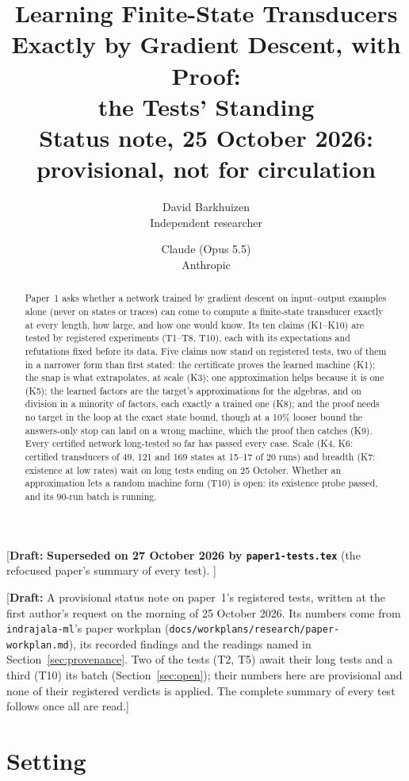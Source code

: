 \documentclass[11pt]{article}
\title{Learning Finite-State Transducers Exactly by Gradient Descent, with Proof:\\
the Tests' Standing\\[0.5em]
\large Status note, 25 October 2026: provisional, not for circulation}
\author{
  David Barkhuizen\\
  Independent researcher
  \and
  Claude (Opus 5.5)\\
  Anthropic
}
\date{}
\newcommand{\draftnote}[1]{\textcolor{red!70!black}{[\textbf{Draft:} #1]}}
\begin{document}
\maketitle

\draftnote{\textbf{Superseded on 27 October 2026 by \texttt{paper1-tests.tex}} (the refocused paper's summary of every test). }

\draftnote{A provisional status note on paper~1's registered tests, written at the first author's
request on the morning of 25 October 2026. Its numbers come from \texttt{indrajala-ml}'s paper
workplan (\texttt{docs/workplans/research/paper-workplan.md}), its recorded findings and the readings named
in Section~\ref{sec:provenance}. Two of the tests (T2, T5) await their long tests and a third
(T10) its batch (Section~\ref{sec:open}); their numbers here are provisional and none of their
registered verdicts is applied. The complete summary of every test follows once all are read.}

\begin{abstract}
Paper~1 asks whether a network trained by gradient descent on input--output examples alone (never
on states or traces) can come to compute a finite-state transducer exactly at every length, how
large, and how one would know. Its ten claims (K1--K10) are tested by registered experiments
(T1--T8, T10), each with its expectations and refutations fixed before its data. Five claims now
stand on registered tests, two of them in a narrower form than first stated: the certificate proves
the learned machine (K1); the snap is what extrapolates, at scale (K3); one approximation helps
because it is one (K5); the learned factors are the target's approximations for the algebras, and on
division in a minority of factors, each exactly a trained one (K8); and the proof needs no target
in the loop at the exact state bound, though at a 10\% looser bound the answers-only stop can land
on a wrong machine, which the proof then catches (K9). Every certified network long-tested so far
has passed every case. Scale (K4, K6: certified transducers of 49, 121 and 169 states at 15--17 of
20 runs) and breadth (K7: existence at low rates) wait on long tests ending on 25 October. Whether
an approximation lets a random machine form (T10) is open: its existence probe passed, and its
90-run batch is running.
\end{abstract}

\section{Setting}
\end{document}
